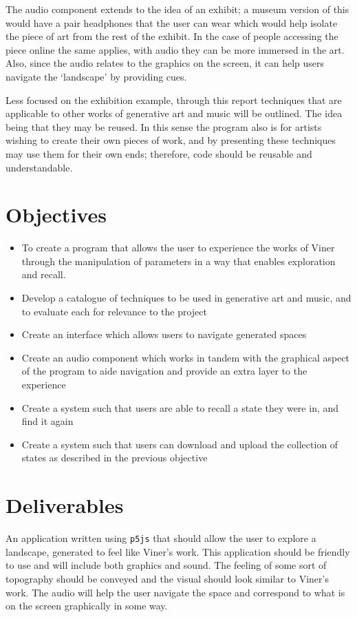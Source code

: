 The audio component extends to the idea of an exhibit; a museum version of this
would have a pair headphones that the user can wear which would help isolate the
piece of art from the rest of the exhibit. In the case of people accessing the
piece online the same applies, with audio they can be more immersed in the art.
Also, since the audio relates to the graphics on the screen, it can help users
navigate the `landscape' by providing cues.

Less focused on the exhibition example, through this report techniques that are
applicable to other works of generative art and music will be outlined. The idea
being that they may be reused. In this sense the program also is for artists
wishing to create their own pieces of work, and by presenting these techniques
may use them for their own ends; therefore, code should be reusable and
understandable.

\section{Objectives}
\begin{itemize}
    \item To create a program that allows the user to experience the works of
        Viner through the manipulation of parameters in a way that enables
        exploration and recall.
    \item Develop a catalogue of techniques to be used in generative art and
        music, and to evaluate each for relevance to the project
    \item Create an interface which allows users to navigate generated spaces
    \item Create an audio component which works in tandem with the graphical aspect
        of the program to aide navigation and provide an extra layer to the
        experience
    \item Create a system such that users are able to recall a state they were
        in, and find it again
    \item Create a system such that users can download and upload the collection
        of states as described in the previous objective
\end{itemize}

\section{Deliverables}
An application written using \verb|p5js| that should allow the user to explore a
landscape, generated to feel like Viner's work. This application should be
friendly to use and will include both graphics and sound. The feeling of some
sort of topography should be conveyed and the visual should look similar to
Viner's work. The audio will help the user navigate the space and correspond to
what is on the screen graphically in some way.

